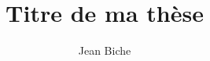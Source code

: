 \documentclass{book}
\title{Titre de ma thèse}
\author{Jean Biche}
\begin{document}
	\makeflyleaf%
	
\end{document}
